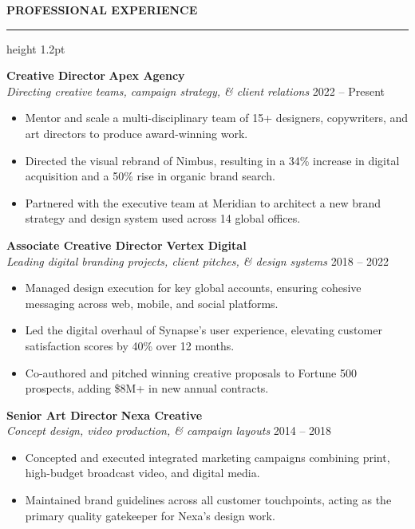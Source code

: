 \documentclass[10pt]{article}
\newcommand{\cvsection}[1]{%
  \vspace{1.2em}%
  {\fontsize{11}{13}\selectfont\color{primary}\textbf{\MakeUppercase{#1}}}\\[0.3em]%
  {\color{accent}\hrule height 1.2pt}%
  \vspace{0.8em}%
}
\newcommand{\experienceItem}[4]{%
  \noindent%
  \begin{minipage}{\linewidth}
    \fontsize{9.5}{11.5}\selectfont\textbf{#1} \hfill \color{accent}\textbf{#2}\\[0.15em]%
    \color{secondary}\fontsize{8.5}{10.5}\selectfont\textit{#3} \hfill \color{secondary}#4%
  \end{minipage}%
  \vspace{0.3em}%
}
\begin{document}
\begin{minipage}[t]{0.67\textwidth}
  \cvsection{Professional Experience}
  
  \experienceItem{Creative Director}{Apex Agency}{Directing creative teams, campaign strategy, \& client relations}{2022 -- Present}
  \begin{itemize}[leftmargin=1.2em, topsep=1pt, itemsep=2.5pt, parsep=0pt]
    \item Mentor and scale a multi-disciplinary team of 15+ designers, copywriters, and art directors to produce award-winning work.
    \item Directed the visual rebrand of Nimbus, resulting in a 34\% increase in digital acquisition and a 50\% rise in organic brand search.
    \item Partnered with the executive team at Meridian to architect a new brand strategy and design system used across 14 global offices.
  \end{itemize}
  
  \vspace{0.8em}
  
  \experienceItem{Associate Creative Director}{Vertex Digital}{Leading digital branding projects, client pitches, \& design systems}{2018 -- 2022}
  \begin{itemize}[leftmargin=1.2em, topsep=1pt, itemsep=2.5pt, parsep=0pt]
    \item Managed design execution for key global accounts, ensuring cohesive messaging across web, mobile, and social platforms.
    \item Led the digital overhaul of Synapse's user experience, elevating customer satisfaction scores by 40\% over 12 months.
    \item Co-authored and pitched winning creative proposals to Fortune 500 prospects, adding \$8M+ in new annual contracts.
  \end{itemize}
  
  \vspace{0.8em}
  
  \experienceItem{Senior Art Director}{Nexa Creative}{Concept design, video production, \& campaign layouts}{2014 -- 2018}
  \begin{itemize}[leftmargin=1.2em, topsep=1pt, itemsep=2.5pt, parsep=0pt]
    \item Concepted and executed integrated marketing campaigns combining print, high-budget broadcast video, and digital media.
    \item Maintained brand guidelines across all customer touchpoints, acting as the primary quality gatekeeper for Nexa's design work.
  \end{itemize}
  

\end{minipage}
\end{document}
